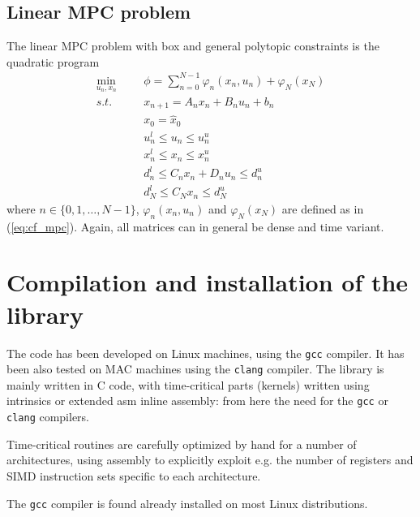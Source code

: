\documentclass[a4paper]{report}
\begin{document}
\section{Linear MPC problem}

The linear MPC problem with box and general polytopic constraints is the quadratic program
\begin{equation}
\begin{aligned}
\min_{u_n,x_n} &&& \phi = \sum_{n=0}^{N-1} \varphi_n(x_n,u_n) + \varphi_N(x_N) \\
s.t. &&& x_{n+1} = A_nx_n+B_nu_n+b_n \\
&&& x_0 = \hat x_0 \\
&&& u_n^l \leq u_n\leq u_n^u \\
&&& x_n^l \leq x_n\leq x_n^u \\
&&& d_n^l \leq C_n x_n + D_n u_n \leq d_n^u \\
&&& d_N^l \leq C_N x_n \leq d_N^u
\end{aligned}
\label{eq:lmpc}
\end{equation}
where $n\in\{0,1,\dots,N-1\}$, $\varphi_n(x_n,u_n)$ and $\varphi_N(x_N)$ are defined as in (\ref{eq:cf_mpc}). Again, all matrices can in general be dense and time variant.



\chapter{Compilation and installation of the library}

The code has been developed on Linux machines, using the {\tt gcc} compiler.
It has been also tested on MAC machines using the {\tt clang} compiler.
The library is mainly written in C code, with time-critical parts (kernels) written using intrinsics or extended asm inline assembly: from here the need for the {\tt gcc} or {\tt clang} compilers.

Time-critical routines are carefully optimized by hand for a number of architectures, using assembly to explicitly exploit e.g. the number of registers and SIMD instruction sets specific to each architecture.


The {\tt gcc} compiler is found already installed on most Linux distributions.
\end{document}
